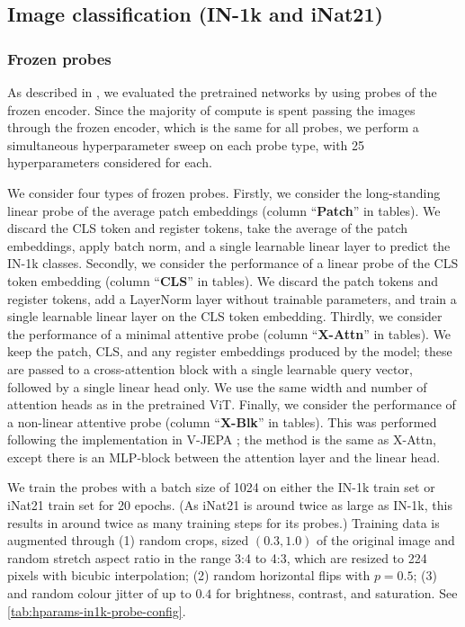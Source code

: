 \subsection{Image classification (IN-1k and iNat21)}

\subsubsection{Frozen probes}
\label{a:eval-method-classification-probe}

As described in \iftoggle{arxiv}{\cref{s:exp:in1k}}{the main text, Sec.~5.1}, we evaluated the pretrained networks by using probes of the frozen encoder.
Since the majority of compute is spent passing the images through the frozen encoder, which is the same for all probes, we perform a simultaneous hyperparameter sweep on each probe type, with 25 hyperparameters considered for each.

We consider four types of frozen probes.
Firstly, we consider the long-standing linear probe of the average patch embeddings (column ``\textbf{Patch}'' in tables).
We discard the CLS token and register tokens, take the average of the patch embeddings, apply batch norm, and a single learnable linear layer to predict the IN-1k classes.
Secondly, we consider the performance of a linear probe of the CLS token embedding (column ``\textbf{CLS}'' in tables).
We discard the patch tokens and register tokens, add a LayerNorm layer without trainable parameters, and train a single learnable linear layer on the CLS token embedding.
Thirdly, we consider the performance of a minimal attentive probe (column ``\textbf{X-Attn}'' in tables).
We keep the patch, CLS, and any register embeddings produced by the model; these are passed to a cross-attention block with a single learnable query vector, followed by a single linear head only.
We use the same width and number of attention heads as in the pretrained ViT.
Finally, we consider the performance of a non-linear attentive probe (column ``\textbf{X-Blk}'' in tables).
This was performed following the implementation in V-JEPA \citep{bardes2024vjepa, assran2025vjepa2}; the method is the same as X-Attn, except there is an MLP-block between the attention layer and the linear head.

We train the probes with a batch size of 1024 on either the IN-1k train set or iNat21 train set \citep{inaturalist21} for 20 epochs.
(As iNat21 is around twice as large as IN-1k, this results in around twice as many training steps for its probes.)
Training data is augmented through (1) random crops, sized $(0.3, 1.0)$ of the original image and random stretch aspect ratio in the range 3:4 to 4:3, which are resized to 224 pixels with bicubic interpolation; (2) random horizontal flips with $p=0.5$; (3) and random colour jitter of up to $0.4$ for brightness, contrast, and saturation.
See \cref{tab:hparams-in1k-probe-config}.

